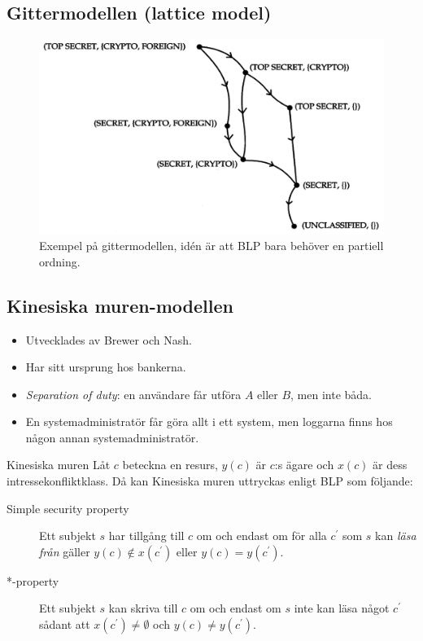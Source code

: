 \subsection{Gittermodellen (lattice model)}
\begin{frame}{\insertsubsectionhead}
  \begin{figure}
    \includegraphics[height=0.7\textheight]{lattice.png}
    \caption{Exempel på gittermodellen, idén är att BLP bara behöver en 
    partiell ordning.}
  \end{figure}
\end{frame}

\subsection{Kinesiska muren-modellen}
\begin{frame}{\insertsubsectionhead}
  \begin{itemize}
    \item Utvecklades av Brewer och Nash.
    \item Har sitt ursprung hos bankerna.
    \item \emph{Separation of duty}: en användare får utföra \(A\) eller \(B\), 
      men inte båda.
    \item En systemadministratör får göra allt i ett system, men loggarna finns 
      hos någon annan systemadministratör.
  \end{itemize}
\end{frame}
\begin{frame}{\insertsubsectionhead}
  \begin{block}{Kinesiska muren}
    Låt \(c\) beteckna en resurs, \(y(c)\) är \(c\):s ägare och \(x(c)\) är 
    dess intressekonfliktklass.
    Då kan Kinesiska muren uttryckas enligt BLP som följande:
    \begin{description}
      \item[Simple security property] Ett subjekt \(s\) har tillgång till \(c\) 
        om och endast om för alla \(c^\prime\) som \(s\) kan \emph{läsa från} 
        gäller \(y(c)\notin x(c^\prime)\) eller \(y(c) = y(c^\prime)\).
      \item[*-property] Ett subjekt \(s\) kan skriva till \(c\) om och endast 
        om \(s\) inte kan läsa något \(c^\prime\) sådant att \(x(c^\prime)\neq 
        \emptyset\) och \(y(c)\neq y(c^\prime)\).
    \end{description}
  \end{block}
\end{frame}

